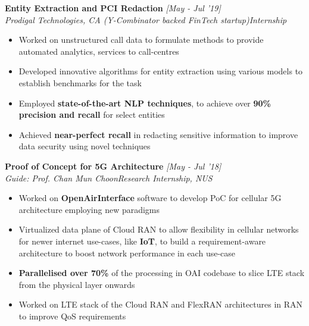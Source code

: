 \documentclass{article}
\begin{document}
\hspace{-4pt}
\textbf{\large{Entity Extraction and PCI Redaction}} \hfill{\sl [May - Jul '19]}\\
{\it Prodigal Technologies, CA (Y-Combinator backed FinTech startup)}\hfill{\sl Internship}\\
\vspace{-19pt}
\begin{itemize}[itemsep = -3pt, leftmargin=*]
	\item Worked on unstructured call data to formulate methods to provide automated analytics, services to call-centres
	\item Developed innovative algorithms for entity extraction using various models to establish benchmarks for the task
	\item Employed \textbf{state-of-the-art NLP techniques}, to achieve over \textbf{90\% precision and recall} for select entities
	\item Achieved \textbf{near-perfect recall} in redacting sensitive information to improve data security using novel techniques
\end{itemize}
\vspace{-2pt}


\hspace{-14pt}\textbf{\large{Proof of Concept for 5G Architecture}} \hfill{\sl [May - Jul '18]}\\
{\it Guide: Prof. Chan Mun Choon}\hfill{\sl Research Internship, NUS}\\
\vspace{-19pt}
\begin{itemize}[itemsep = -3pt, leftmargin=*]
	\item Worked on \textbf{OpenAirInterface} software to develop PoC for cellular 5G architecture employing new paradigms
	\item Virtualized data plane of Cloud RAN to allow flexibility in cellular networks for newer internet use-cases, like \textbf{IoT}, to build a requirement-aware architecture to boost network performance in each use-case
	\item \textbf{Parallelised over 70\%} of the processing in OAI codebase to slice LTE stack from the physical layer onwards
	\item Worked on LTE stack of the Cloud RAN and FlexRAN architectures in RAN to improve QoS requirements
\end{itemize}
\vspace{-2pt}
\end{document}
